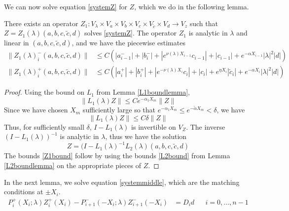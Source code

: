 \documentclass[thesis.tex]{subfiles}
\begin{document}
We can now solve equation \eqref{systemZ} for $Z$, which we do in the following lemma.

\begin{lemma}\label{Zinv0}
There exists an operator $Z_1: V_\lambda \times V_a \times V_b \times V_c \times V_{\tilde{c}} \times V_d \rightarrow V_z$ such that $Z = Z_1(\lambda)(a,b,c,\tilde{c},d)$ solves \eqref{systemZ}. The operator $Z_1$ is analytic in $\lambda$ and linear in $(a,b,c,\tilde{c},d)$, and we have the piecewise estimates
\begin{equation}\label{Z1bound}
\begin{aligned}
\| Z_1(\lambda)_i^-(a,b,c,\tilde{c},d) \| &\leq C(|a_{i-1}^-| + |b_i^-| + |e^{\nu(\lambda)X_{i-1}}c_{i-1}| + |c_{i-1}| + e^{-\alpha X_{i-1}}|\lambda|^2|d|) \\
\| Z_1(\lambda)_i^+(a,b,c,\tilde{c},d) \| &\leq C(|a_i^+| + |b_i^+| + |e^{-\nu(\lambda)X_i} c_i| + |c_i| + e^{\eta X_i}|\tilde{c}_i| + e^{-\alpha X_i}|\lambda|^2|d|)
\end{aligned}
\end{equation}
\begin{proof}

Using the bound on $L_1$ from Lemma \ref{L1boundlemma}, 
\[
\|L_1(\lambda)Z\| \leq C e^{-\alpha_1 X_m}\|Z\|
\]
Since we have chosen $X_m$ sufficiently large so that
$e^{-\alpha_1 X_m} \leq e^{-\tilde{\alpha} X_m} < \delta$, we have
\[
\|L_1(\lambda)Z\| \leq C \delta \|Z\|
\]
Thus, for sufficiently small $\delta$, $I - L_1(\lambda)$ is invertible on $V_Z$. The inverse $(I - L_1(\lambda))^{-1}$ is analytic in $\lambda$, thus we have the solution
\begin{equation}\label{L1L2eq}
Z = (I - L_1(\lambda)^{-1}L_2(\lambda)(a,b,c,\tilde{c},d)
\end{equation}
The bounds \eqref{Z1bound} follow by using the bounds \eqref{L2bound} from Lemma \ref{L2boundlemma} on the appropriate pieces of $Z$.
\end{proof}
\end{lemma}

In the next lemma, we solve equation \eqref{systemmiddle}, which are the matching conditions at $\pm X_i$.
\begin{align*}
P_i^+(X_i; \lambda) Z_i^+(X_i) - P_{i+1}^-(-X_i; \lambda) Z_{i+1}^-(-X_i) &= D_i d && i = 0, \dots, n-1
\end{align*}
\end{document}
